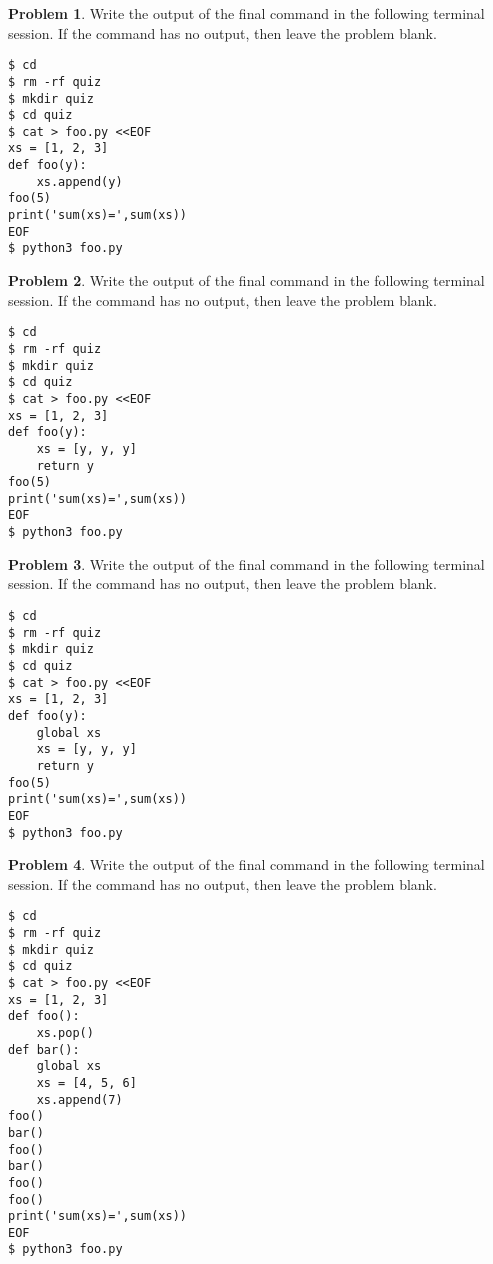 \documentclass[10pt]{article}
\theoremstyle{definition}
\newtheorem{problem}{Problem}
\begin{document}
\begin{problem}
    Write the output of the final command in the following terminal session.
    If the command has no output, then leave the problem blank.
\end{problem}
\begin{lstlisting}
$ cd
$ rm -rf quiz
$ mkdir quiz
$ cd quiz
$ cat > foo.py <<EOF
xs = [1, 2, 3]
def foo(y):
    xs.append(y)
foo(5)
print('sum(xs)=',sum(xs))
EOF
$ python3 foo.py
\end{lstlisting}
\vspace{0.4in}


\begin{problem}
    Write the output of the final command in the following terminal session.
    If the command has no output, then leave the problem blank.
\end{problem}
\begin{lstlisting}
$ cd
$ rm -rf quiz
$ mkdir quiz
$ cd quiz
$ cat > foo.py <<EOF
xs = [1, 2, 3]
def foo(y):
    xs = [y, y, y]
    return y
foo(5)
print('sum(xs)=',sum(xs))
EOF
$ python3 foo.py
\end{lstlisting}
\vspace{0.4in}


\begin{problem}
    Write the output of the final command in the following terminal session.
    If the command has no output, then leave the problem blank.
\end{problem}
\begin{lstlisting}
$ cd
$ rm -rf quiz
$ mkdir quiz
$ cd quiz
$ cat > foo.py <<EOF
xs = [1, 2, 3]
def foo(y):
    global xs
    xs = [y, y, y]
    return y
foo(5)
print('sum(xs)=',sum(xs))
EOF
$ python3 foo.py
\end{lstlisting}
\vspace{0.4in}


\newpage
\begin{problem}
    Write the output of the final command in the following terminal session.
    If the command has no output, then leave the problem blank.
\end{problem}
\begin{lstlisting}
$ cd
$ rm -rf quiz
$ mkdir quiz
$ cd quiz
$ cat > foo.py <<EOF
xs = [1, 2, 3]
def foo():
    xs.pop()
def bar():
    global xs
    xs = [4, 5, 6]
    xs.append(7)
foo()
bar()
foo()
bar()
foo()
foo()
print('sum(xs)=',sum(xs))
EOF
$ python3 foo.py
\end{lstlisting}
\vspace{0.4in}
\end{document}
